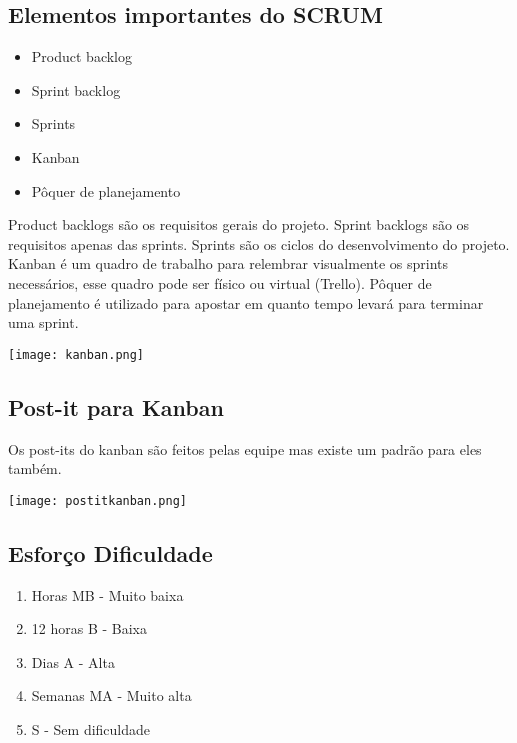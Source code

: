\documentclass{article}
\begin{document}
\subsection*{Elementos importantes do SCRUM}
\begin{itemize}
    \item Product backlog
    \item Sprint backlog
    \item Sprints
    \item Kanban
    \item Pôquer de planejamento
\end{itemize}

Product backlogs são os requisitos gerais do projeto.
Sprint backlogs são os requisitos apenas das sprints.
Sprints são os ciclos do desenvolvimento do projeto.
Kanban é um quadro de trabalho para relembrar visualmente os sprints necessários,
esse quadro pode ser físico ou virtual (Trello).
Pôquer de planejamento é utilizado para apostar
em quanto tempo levará para terminar uma sprint.

\begin{center}
    \texttt{[image: kanban.png]}
\end{center}

\subsection*{Post-it para Kanban}
Os post-its do kanban são feitos pelas equipe mas existe um padrão
para eles também.

\begin{center}
    \texttt{[image: postitkanban.png]}
\end{center}

\subsection*{Esforço \hfill Dificuldade}
\begin{enumerate}
    \item Horas \hfill MB - Muito baixa
    \item 12 horas \hfill B - Baixa
    \item Dias \hfill A - Alta
    \item Semanas \hfill MA - Muito alta
    \item[] \hfill S - Sem dificuldade
\end{enumerate}

\newpage
\thispagestyle{headings}
\end{document}
